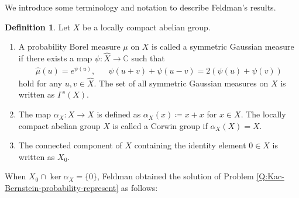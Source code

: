 \documentclass[12pt]{article}
\theoremstyle{definition}
\newtheorem{definition}[theorem]{Definition}
\theoremstyle{remark}
\numberwithin{equation}{section}
\numberwithin{figure}{section}
\numberwithin{table}{section}
\begin{document}
We introduce some terminology and notation to describe Feldman's results.

\begin{definition}

Let $ X $ be a locally compact abelian group.

\begin{enumerate}

    \item 
    
A probability Borel measure $ \mu $ on $ X $ is called a symmetric Gaussian measure if there exists a map $ \psi \colon \hat{ X } \to \mathbb{ C } $ such that
\begin{align}
    \hat{ \mu } ( u ) = e^{ \psi ( u ) }, & & \psi ( u + v ) + \psi ( u - v ) = 2 ( \psi ( u ) + \psi ( v ) )
\end{align}
hold for any $ u , v \in \hat{ X } $.
The set of all symmetric Gaussian measures on $ X $ is written as $ \Gamma^s ( X ) $.

    \item 

    The map $ \alpha_X \colon X \to X $ is defined as $ \alpha_X ( x ) \coloneqq x + x $ for $ x \in X $.
    The locally compact abelian group $ X $ is called a Corwin group if $ \alpha_X ( X ) = X $.

\item

The connected component of $ X $ containing the identity element $ 0 \in X $ is written as $ X_0 $.

\end{enumerate}
    
\end{definition}

When $ X_0 \cap \ker \alpha_X = \{ 0 \} $, Feldman obtained the solution of Problem \ref{Q:Kac-Bernstein-probability-represent} as follows:
\end{document}
